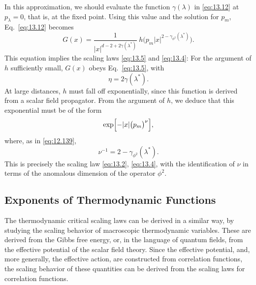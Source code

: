 In this approximation, we should evaluate the function $\gamma(\lambda)$ in
\eqref{eq:13.12} at $p_\lambda = 0$, that is, at the fixed point.  Using this
value and the solution for $p_m$, Eq.~\eqref{eq:13.12} becomes
\begin{equation}
  G(x) = \frac{1}{|x|^{d-2+2\gamma(\lambda^{*})}}\ h\bigl(
    p_m|x|^{2-\gamma_{\phi^2}(\lambda^{*})} \bigr) .
  \label{eq:13.16}
\end{equation}
This equation implies the scaling laws \eqref{eq:13.5} and \eqref{eq:13.4}:
For the argument of $h$ sufficiently small, $G(x)$ obeys Eq.~\eqref{eq:13.5},
with
\begin{equation}
  \eta = 2\gamma(\lambda^{*}) .
  \label{eq:13.17}
\end{equation}
At large distances, $h$ must fall off exponentially, since this function is
derived from a scalar field propagator.  From the argument of $h$, we deduce
that this exponential must be of the form
\begin{equation}
  \exp\Bigl[ -|x|\bigl( p_m \bigr)^{\nu} \Bigr] ,
  \label{eq:13.18}
\end{equation}
where, as in \eqref{eq:12.139},
\begin{equation}
  \nu^{-1} = 2 - \gamma_{\phi^2}(\lambda^{*}) .
  \label{eq:13.19}
\end{equation}
This is precisely the scaling law \eqref{eq:13.2}, \eqref{eq:13.4}, with the
identification of $\nu$ in terms of the anomalous dimension of the operator
$\phi^2$.

\subsection{Exponents of Thermodynamic Functions}

The thermodynamic critical scaling laws can be derived in a similar way, by
studying the scaling behavior of macroscopic thermodynamic variables.  These
are derived from the Gibbs free energy, or, in the language of quantum fields,
from the effective potential of the scalar field theory.  Since the effective
potential, and, more generally, the effective action, are constructed from
correlation functions, the scaling behavior of these quantities can be derived
from the scaling laws for correlation functions.

